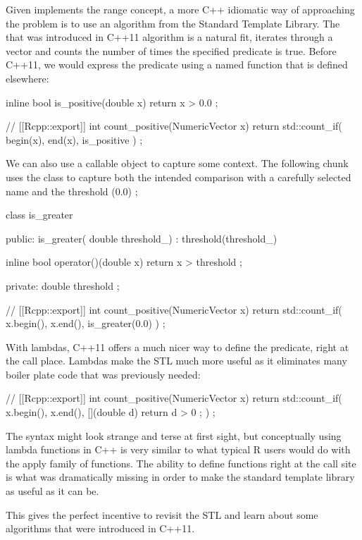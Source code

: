 Given  implements the range concept, a more C++ idiomatic
way of approaching the problem is to use an algorithm from the Standard
Template Library. The  that was introduced
in C++11 algorithm is a natural fit,  iterates through a vector
and counts the number of times the specified predicate is true. Before C++11, 
we would express the predicate using a named function that is defined
elsewhere: 

\begin{example}
inline bool is_positive(double x){
  return x > 0.0 ;
}

// [[Rcpp::export]]
int count_positive(NumericVector x){
  return std::count_if( begin(x), end(x), is_positive ) ;
}
\end{example}

We can also use a callable object to capture some context. The 
following chunk uses the  class to capture both the 
intended comparison with a carefully selected name and the threshold (0.0) ;

\begin{example}
class is_greater {
public:
  is_greater( double threshold_) : threshold(threshold_){}
  
  inline bool operator()(double x){
    return x > threshold ;
  }
  
private:
  double threshold ;
}
// [[Rcpp::export]]
int count_positive(NumericVector x){
  return std::count_if( x.begin(), x.end(), is_greater(0.0) ) ;
}
\end{example}

With lambdas, C++11 offers a much nicer way to define the predicate, right at the 
call place. Lambdas make the STL much more useful as it eliminates 
many boiler plate code that was previously needed:

\begin{example}
// [[Rcpp::export]]
int count_positive(NumericVector x){
  return std::count_if( x.begin(), x.end(), 
    [](double d){ return d > 0 ;}
  ) ;
}
\end{example}

The syntax might look strange and terse at first sight, but conceptually 
using lambda functions in C++ is very similar to what typical R users
would do with the apply family of functions. The ability to define 
functions right at the call site is what was dramatically missing in order
to make the standard template library as useful as it can be. 

This gives the perfect incentive to revisit the STL and learn about some
algorithms that were introduced in C++11.  

